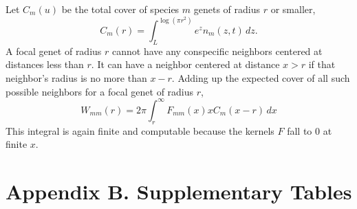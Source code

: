 \documentclass[11pt]{article}
\begin{document}
Let $C_m(u)$ be the total cover of species $m$ genets of radius $r$ or smaller, 
\begin{equation}
C_m(r) = \int_L^{\log(\pi r^2)}{\! \! \! e^z n_m(z,t) \, dz} .
\label{eqn:cm}
\end{equation}
A focal genet of radius $r$ cannot have any conspecific neighbors centered 
at distances less than $r$. It can have a neighbor centered at distance $x>r$ if that neighbor's
radius is no more than $x-r$. Adding up the expected cover of all such possible neighbors
for a focal genet of radius $r$,    
\begin{equation}
W_{mm}(r) = 2 \pi \int_r^{\infty}F_{mm}(x) x C_m(x-r) \, dx
\label{eqn:wbarmr} 
\end{equation}
This integral is again finite and computable because the kernels $F$ fall to 0 at finite $x$. 

\clearpage 
\newpage  

\renewcommand{\thesection}{B.\arabic{section}}

\section*{Appendix B. Supplementary Tables} 

\end{document}
